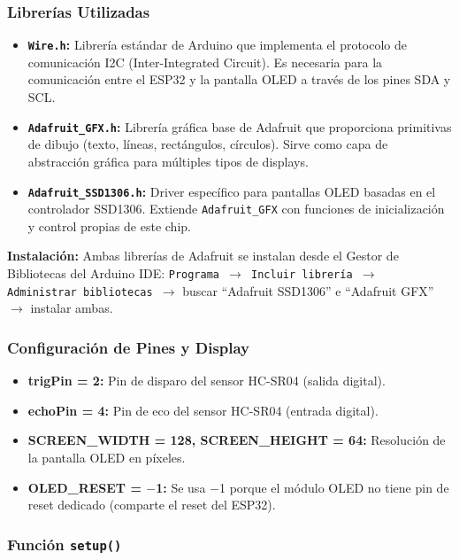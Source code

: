 \documentclass[12pt,a4paper]{article}
\begin{document}
\subsubsection*{Librerías Utilizadas}

\begin{itemize}
    \item \textbf{\texttt{Wire.h}:} Librería estándar de Arduino que implementa el protocolo de comunicación I2C (Inter-Integrated Circuit). Es necesaria para la comunicación entre el ESP32 y la pantalla OLED a través de los pines SDA y SCL.
    \item \textbf{\texttt{Adafruit\_GFX.h}:} Librería gráfica base de Adafruit que proporciona primitivas de dibujo (texto, líneas, rectángulos, círculos). Sirve como capa de abstracción gráfica para múltiples tipos de displays.
    \item \textbf{\texttt{Adafruit\_SSD1306.h}:} Driver específico para pantallas OLED basadas en el controlador SSD1306. Extiende \texttt{Adafruit\_GFX} con funciones de inicialización y control propias de este chip.
\end{itemize}

\textbf{Instalación:} Ambas librerías de Adafruit se instalan desde el Gestor de Bibliotecas del Arduino IDE: \texttt{Programa $\rightarrow$ Incluir librería $\rightarrow$ Administrar bibliotecas $\rightarrow$} buscar ``Adafruit SSD1306'' e ``Adafruit GFX'' $\rightarrow$ instalar ambas.

\subsubsection*{Configuración de Pines y Display}

\begin{itemize}
    \item \textbf{trigPin = 2:} Pin de disparo del sensor HC-SR04 (salida digital).
    \item \textbf{echoPin = 4:} Pin de eco del sensor HC-SR04 (entrada digital).
    \item \textbf{SCREEN\_WIDTH = 128, SCREEN\_HEIGHT = 64:} Resolución de la pantalla OLED en píxeles.
    \item \textbf{OLED\_RESET = $-$1:} Se usa $-$1 porque el módulo OLED no tiene pin de reset dedicado (comparte el reset del ESP32).
\end{itemize}

\subsubsection*{Función \texttt{setup()}}
\end{document}

